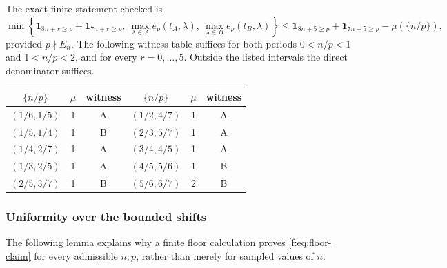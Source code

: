 \documentclass[11pt]{amsart}
\newcommand{\ind}{\mathbf 1}
\theoremstyle{plain}
\theoremstyle{remark}\newtheorem{remark}[theorem]{Remark}
\numberwithin{equation}{section}
\begin{document}
The exact finite statement checked is
\begin{equation}\label{f:eq:floor-claim}
 \min\left\{
 \ind_{8n+r\geq p}+\ind_{7n+r\geq p},\
 \max_{\lambda\in A}e_p(t_A,\lambda),\
 \max_{\lambda\in B}e_p(t_B,\lambda)
 \right\}
 \leq\ind_{8n+5\geq p}+\ind_{7n+5\geq p}-\mu(\{n/p\}),
\end{equation}
provided $p\nmid E_n$. The following witness table suffices for both periods $0<n/p<1$ and $1<n/p<2$, and for every $r=0,\ldots,5$. Outside the listed intervals the direct denominator suffices.
\begin{center}
\begin{tabular}{ccc@{\qquad}ccc}
\toprule
$\{n/p\}$ & $\mu$ & witness & $\{n/p\}$ & $\mu$ & witness\\
\midrule
$(1/6,1/5)$ & 1&A & $(1/2,4/7)$&1&A\\
$(1/5,1/4)$ & 1&B & $(2/3,5/7)$&1&A\\
$(1/4,2/7)$ & 1&A & $(3/4,4/5)$&1&A\\
$(1/3,2/5)$ & 1&A & $(4/5,5/6)$&1&B\\
$(2/5,3/7)$ & 1&B & $(5/6,6/7)$&2&B\\
\bottomrule
\end{tabular}
\end{center}

\subsubsection{Uniformity over the bounded shifts}
The following lemma explains why a finite floor calculation proves
\eqref{f:eq:floor-claim} for every admissible $n,p$, rather than merely
for sampled values of $n$.
\end{document}
